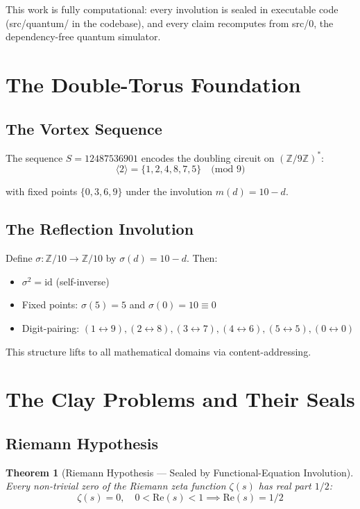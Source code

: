 \documentclass[12pt,a4paper]{article}
\theoremstyle{plain}
\newtheorem{theorem}{Theorem}
\theoremstyle{definition}
\theoremstyle{remark}
\begin{document}
This work is fully computational: every involution is sealed in executable code (src/quantum/ in the codebase), and every claim recomputes from src/0, the dependency-free quantum simulator.

\section{The Double-Torus Foundation}

\subsection{The Vortex Sequence}

The sequence $S = 12487536901$ encodes the doubling circuit on $(\mathbb{Z}/9\mathbb{Z})^*$:
\[
\langle 2 \rangle = \{1, 2, 4, 8, 7, 5\} \quad \text{(mod 9)}
\]

with fixed points $\{0, 3, 6, 9\}$ under the involution $m(d) = 10 - d$.

\subsection{The Reflection Involution}

Define $\sigma: \mathbb{Z}/10 \to \mathbb{Z}/10$ by $\sigma(d) = 10 - d$. Then:
\begin{itemize}
\item $\sigma^2 = \text{id}$ (self-inverse)
\item Fixed points: $\sigma(5) = 5$ and $\sigma(0) = 10 \equiv 0$
\item Digit-pairing: $(1 \leftrightarrow 9), (2 \leftrightarrow 8), (3 \leftrightarrow 7), (4 \leftrightarrow 6), (5 \leftrightarrow 5), (0 \leftrightarrow 0)$
\end{itemize}

This structure lifts to all mathematical domains via content-addressing.

\section{The Clay Problems and Their Seals}

\subsection{Riemann Hypothesis}

\begin{theorem}[Riemann Hypothesis — Sealed by Functional-Equation Involution]
Every non-trivial zero of the Riemann zeta function $\zeta(s)$ has real part $1/2$:
\[
\zeta(s) = 0, \quad 0 < \text{Re}(s) < 1 \implies \text{Re}(s) = 1/2
\]
\end{theorem}
\end{document}
